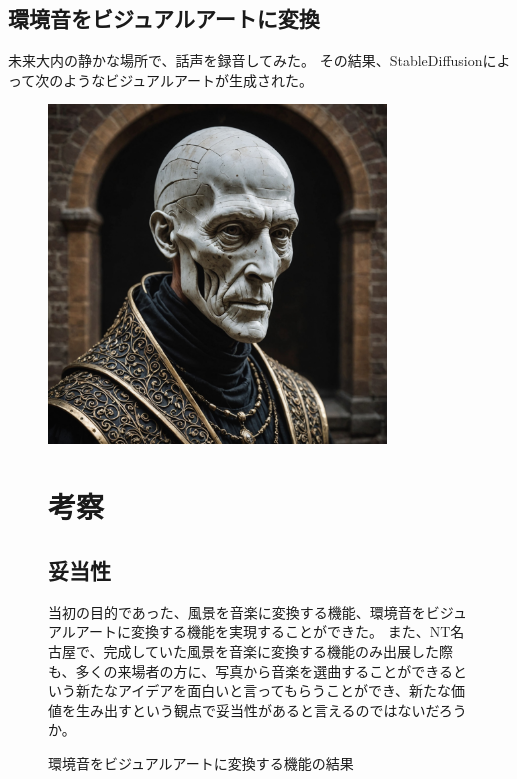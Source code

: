 \section{環境音をビジュアルアートに変換}
未来大内の静かな場所で、話声を録音してみた。
その結果、StableDiffusionによって次のようなビジュアルアートが生成された。
\begin{figure}[h]
  \centering
  \includegraphics[width=0.8\textwidth]{pages/report/images/output_image.jpeg}
  \caption{環境音をビジュアルアートに変換する機能の結果}
  \label{fig:environmental-sound-to-visual-art}

\chapter{考察}
\section{妥当性}
当初の目的であった、風景を音楽に変換する機能、環境音をビジュアルアートに変換する機能を実現することができた。
また、NT名古屋で、完成していた風景を音楽に変換する機能のみ出展した際も、多くの来場者の方に、写真から音楽を選曲することができるという新たなアイデアを面白いと言ってもらうことができ、新たな価値を生み出すという観点で妥当性があると言えるのではないだろうか。


\end{figure}
